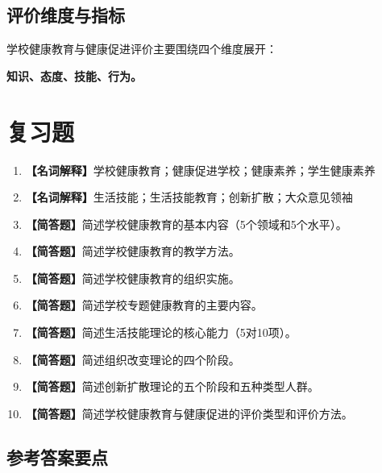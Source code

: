 \subsection{评价维度与指标}

\begin{defbox}
学校健康教育与健康促进评价主要围绕四个维度展开：

\textbf{知识、态度、技能、行为。}
\end{defbox}

\section{复习题}

\begin{enumerate}[leftmargin=*, itemsep=8pt]
    \item \textbf{【名词解释】}学校健康教育；健康促进学校；健康素养；学生健康素养
    \item \textbf{【名词解释】}生活技能；生活技能教育；创新扩散；大众意见领袖
    \item \textbf{【简答题】}简述学校健康教育的基本内容（5个领域和5个水平）。
    \item \textbf{【简答题】}简述学校健康教育的教学方法。
    \item \textbf{【简答题】}简述学校健康教育的组织实施。
    \item \textbf{【简答题】}简述学校专题健康教育的主要内容。
    \item \textbf{【简答题】}简述生活技能理论的核心能力（5对10项）。
    \item \textbf{【简答题】}简述组织改变理论的四个阶段。
    \item \textbf{【简答题】}简述创新扩散理论的五个阶段和五种类型人群。
    \item \textbf{【简答题】}简述学校健康教育与健康促进的评价类型和评价方法。
\end{enumerate}

\subsection*{参考答案要点}


